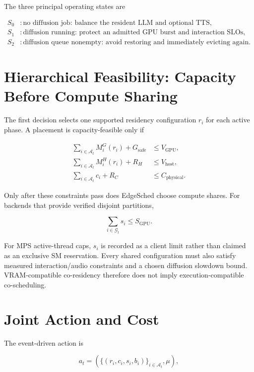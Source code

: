 \documentclass[10pt]{article}
\begin{document}
The three principal operating states are

\begin{align*}
S_0 &: \text{no diffusion job: balance the resident LLM and optional TTS},\\
S_1 &: \text{diffusion running: protect an admitted GPU burst and interaction SLOs},\\
S_2 &: \text{diffusion queue nonempty: avoid restoring and immediately evicting again}.
\end{align*}

\section*{Hierarchical Feasibility: Capacity Before Compute Sharing}

The first decision selects one supported residency configuration $r_i$ for each
active phase.  A placement is capacity-feasible only if

\begin{align}
\sum_{i\in\mathcal A_t} M_i^G(r_i)+G_{\mathrm{safe}} &\le V_{\mathrm{GPU}},\\
\sum_{i\in\mathcal A_t} M_i^H(r_i)+R_H &\le V_{\mathrm{host}},\\
\sum_{i\in\mathcal A_t} c_i+R_C &\le C_{\mathrm{physical}}.
\end{align}

Only after these constraints pass does EdgeSched choose compute shares.  For
backends that provide verified disjoint partitions,

\begin{equation}
\sum_{i\in\mathcal G_t}s_i\le S_{\mathrm{GPU}}.
\end{equation}

For MPS active-thread caps, $s_i$ is recorded as a client limit rather than
claimed as an exclusive SM reservation.  Every shared configuration must also
satisfy measured interaction/audio constraints and a chosen diffusion slowdown
bound.  VRAM-compatible co-residency therefore does not imply execution-compatible
co-scheduling.

\section*{Joint Action and Cost}

The event-driven action is

\begin{equation}
a_t=\left({\bigl\{(r_i,c_i,s_i,b_i)\bigr\}}_{i\in\mathcal A_t},\mu\right),
\end{equation}
\end{document}
